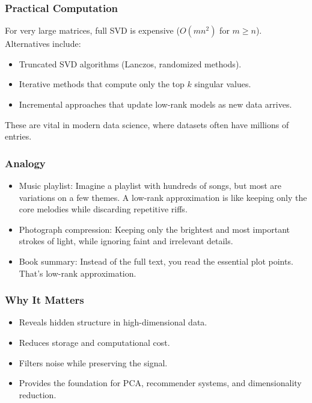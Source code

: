 \documentclass[
  letterpaper,
  DIV=11,
  numbers=noendperiod]{scrreprt}
\providecommand{\tightlist}{%
  \setlength{\itemsep}{0pt}\setlength{\parskip}{0pt}}
\begin{document}
\subsubsection{Practical Computation}\label{practical-computation}

For very large matrices, full SVD is expensive (\(O(mn^2)\) for
\(m \geq n\)). Alternatives include:

\begin{itemize}
\tightlist
\item
  Truncated SVD algorithms (Lanczos, randomized methods).
\item
  Iterative methods that compute only the top \(k\) singular values.
\item
  Incremental approaches that update low-rank models as new data
  arrives.
\end{itemize}

These are vital in modern data science, where datasets often have
millions of entries.

\subsubsection{Analogy}\label{analogy}

\begin{itemize}
\tightlist
\item
  Music playlist: Imagine a playlist with hundreds of songs, but most
  are variations on a few themes. A low-rank approximation is like
  keeping only the core melodies while discarding repetitive riffs.
\item
  Photograph compression: Keeping only the brightest and most important
  strokes of light, while ignoring faint and irrelevant details.
\item
  Book summary: Instead of the full text, you read the essential plot
  points. That's low-rank approximation.
\end{itemize}

\subsubsection{Why It Matters}\label{why-it-matters-80}

\begin{itemize}
\tightlist
\item
  Reveals hidden structure in high-dimensional data.
\item
  Reduces storage and computational cost.
\item
  Filters noise while preserving the signal.
\item
  Provides the foundation for PCA, recommender systems, and
  dimensionality reduction.
\end{itemize}
\end{document}
